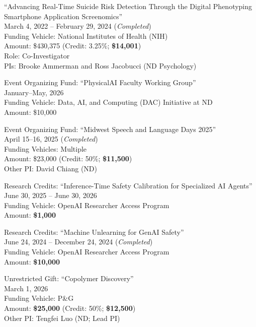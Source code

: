 \documentclass[10pt]{article}
\newenvironment{myindentpar}[1]%
{\begin{list}{}%
         {\setlength{\leftmargin}{#1}}%
         \item[]%
}
{\end{list}}
\newcounter{list}
\begin{document}
\begin{myindentpar}{0.75cm}
\hspace{-0.75cm}``Advancing Real-Time Suicide Risk Detection Through the Digital Phenotyping Smartphone Application Screenomics'' \\
March 4, 2022 -- February 29, 2024 (\emph{Completed}) \\
Funding Vehicle: National Institutes of Health  (NIH) \\
Amount: \$430,375 (Credit: 3.25\%; \textbf{\$14,001}) \\
Role: {Co-Investigator} \\
PIs: Brooke Ammerman and Ross Jacobucci (ND Psychology)

\hspace{-0.75cm}Event Organizing Fund: ``PhysicalAI Faculty Working Group''\\
January--May, 2026 \\
Funding Vehicle: Data, AI, and Computing (DAC) Initiative at ND \\
Amount: \$10,000

\hspace{-0.75cm}Event Organizing Fund: ``Midwest Speech and Language Days 2025''\\
April 15--16, 2025 (\emph{Completed}) \\
Funding Vehicles: Multiple \\
Amount: \$23,000 (Credit: 50\%; \textbf{\$11,500}) \\
Other PI: David Chiang (ND)

\hspace{-0.75cm}Research Credits: ``Inference-Time Safety Calibration for Specialized AI Agents''\\
June 30, 2025 -- June 30, 2026 \\
Funding Vehicle: OpenAI Researcher Access Program \\
Amount: \textbf{\$1,000}

\hspace{-0.75cm}Research Credits: ``Machine Unlearning for GenAI Safety''\\
June 24, 2024 -- December 24, 2024 (\emph{Completed}) \\
Funding Vehicle: OpenAI Researcher Access Program \\
Amount: \textbf{\$10,000}

\hspace{-0.75cm}Unrestricted Gift: ``Copolymer Discovery'' \\
March 1, 2026 \\
Funding Vehicle: P\&G \\
Amount: \textbf{\$25,000} (Credit: 50\%; \textbf{\$12,500}) \\
Other PI: Tengfei Luo (ND; Lead PI)


\end{myindentpar}
\end{document}
